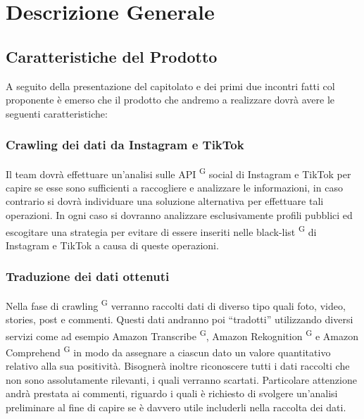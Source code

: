 \section{Descrizione Generale}

\subsection{Caratteristiche del Prodotto}

A seguito della presentazione del capitolato e dei primi due incontri fatti col proponente è emerso che il prodotto che andremo a realizzare dovrà avere le seguenti caratteristiche:

\subsubsection{Crawling dei dati da Instagram e TikTok}
Il team dovrà effettuare un’analisi sulle API \textsuperscript{G} social di Instagram e TikTok per capire se esse sono sufficienti a raccogliere e analizzare le informazioni, in caso contrario si dovrà individuare una soluzione alternativa per effettuare tali operazioni. In ogni caso si dovranno analizzare esclusivamente profili pubblici ed escogitare una strategia per evitare di essere inseriti nelle black-list \textsuperscript{G} di Instagram e TikTok a causa di queste operazioni.

\subsubsection{Traduzione dei dati ottenuti}
Nella fase di crawling \textsuperscript{G} verranno raccolti dati di diverso tipo quali foto, video, stories, post e commenti. Questi dati andranno poi “tradotti” utilizzando diversi servizi come ad esempio Amazon Transcribe \textsuperscript{G}, Amazon Rekognition \textsuperscript{G} e Amazon Comprehend \textsuperscript{G} in modo da assegnare a ciascun dato un valore quantitativo relativo alla sua positività. Bisognerà inoltre riconoscere tutti i dati raccolti che non sono assolutamente rilevanti, i quali verranno scartati. Particolare attenzione andrà prestata ai commenti, riguardo i quali è richiesto di svolgere un’analisi preliminare al fine di capire se è davvero utile includerli nella raccolta dei dati.

